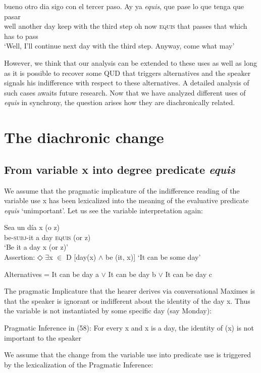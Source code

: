 \documentclass[output=paper
,modfonts
,nonflat]{langsci/langscibook}
\begin{document}
\ea
\gll bueno otro dia sigo con el tercer paso. Ay ya \textit{equis}, que pase lo que tenga que pasar\\
well another day keep with the third step oh now \textsc{equis} that passes that which has to pass\\
\glt ‘Well, I’ll continue next day with the third step. Anyway, come what may’
\z

However, we think that our analysis can be extended to these uses as well as long as it is possible to recover some QUD that triggers alternatives and the speaker signals his indifference with respect to these alternatives. A detailed analysis of such cases awaits future research.
Now that we have analyzed different uses of \textit{equis} in synchrony, the question arises how they are diachronically related.

\section{The diachronic change}\label{sec:kellert:4}

\subsection{From variable x into degree predicate \textit{equis}}\label{sec:kellert:4.1}
We assume that the pragmatic implicature of the indifference reading of the variable use x has been lexicalized into the meaning of the evaluative predicate \textit{equis} ‘unimportant’.  Let us see the variable interpretation again:

\ea
\gll Sea un día x (o z)\\
 be-\textsc{subj}-it a day \textsc{equis} (or z)\\	
\glt ‘Be it a day x (or z)’\\  
Assertion: ◇ $\exists$x $\in$ D {[}day(x) $\wedge$ be (it, x){]} ‘It can be some day’\par
Alternatives = It can be day a $\vee$ It can be day b $\vee$ It can be day c
\z

The pragmatic Implicature that the hearer derives via conversational Maximes is that the speaker is ignorant or indifferent about the identity of the day x. Thus the variable is not instantiated by some specific day (say Monday):

\ea Pragmatic Inference in (58): For every x and x is a day, the identity of (x) is not important to the speaker
\z

We assume that the change from the variable use into predicate use is triggered by the lexicalization of the Pragmatic Inference:
\end{document}
